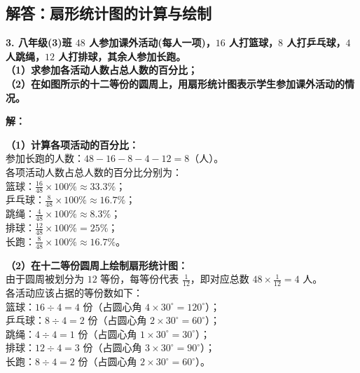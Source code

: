 ﻿%

\subsection{解答：扇形统计图的计算与绘制}

\vspace{0.6cm}

\textbf{3. 八年级(3)班 $48$ 人参加课外活动(每人一项)，$16$ 人打篮球，$8$ 人打乒乓球，$4$ 人跳绳，$12$ 人打排球，其余人参加长跑。}\\
\textbf{（1）求参加各活动人数占总人数的百分比；}\\
\textbf{（2）在如图所示的十二等份的圆周上，用扇形统计图表示学生参加课外活动的情况。}

\vspace{0.4cm}

\textbf{解：}

\textbf{（1）计算各项活动的百分比：} \\
参加长跑的人数：$48 - 16 - 8 - 4 - 12 = 8$（人）。\\
各项活动人数占总人数的百分比分别为：\\
篮球：$\frac{16}{48} \times 100\% \approx 33.3\%$；\\
乒乓球：$\frac{8}{48} \times 100\% \approx 16.7\%$；\\
跳绳：$\frac{4}{48} \times 100\% \approx 8.3\%$；\\
排球：$\frac{12}{48} \times 100\% = 25\%$；\\
长跑：$\frac{8}{48} \times 100\% \approx 16.7\%$。

\vspace{0.4cm}

\textbf{（2）在十二等份圆周上绘制扇形统计图：} \\
由于圆周被划分为 $12$ 等份，每等份代表 $\frac{1}{12}$，即对应总数 $48 \times \frac{1}{12} = 4$ 人。\\
各活动应该占据的等份数如下：\\
篮球：$16 \div 4 = 4$ 份（占圆心角 $4 \times 30^\circ = 120^\circ$）；\\
乒乓球：$8 \div 4 = 2$ 份（占圆心角 $2 \times 30^\circ = 60^\circ$）；\\
跳绳：$4 \div 4 = 1$ 份（占圆心角 $1 \times 30^\circ = 30^\circ$）；\\
排球：$12 \div 4 = 3$ 份（占圆心角 $3 \times 30^\circ = 90^\circ$）；\\
长跑：$8 \div 4 = 2$ 份（占圆心角 $2 \times 30^\circ = 60^\circ$）。

